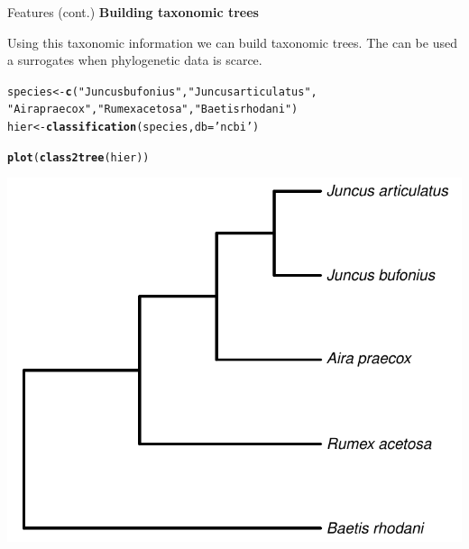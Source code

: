 \documentclass[final,t]{beamer}\usepackage[]{graphicx}\usepackage[]{color}
\makeatletter
\newcommand{\hlstr}[1]{\textcolor[rgb]{0.192,0.494,0.8}{#1}}%
\newcommand{\hlstd}[1]{\textcolor[rgb]{0.345,0.345,0.345}{#1}}%
\newcommand{\hlkwb}[1]{\textcolor[rgb]{0.69,0.353,0.396}{#1}}%
\newcommand{\hlkwc}[1]{\textcolor[rgb]{0.333,0.667,0.333}{#1}}%
\newcommand{\hlkwd}[1]{\textcolor[rgb]{0.737,0.353,0.396}{\textbf{#1}}}%
\newenvironment{kframe}{%
 \def\at@end@of@kframe{}%
 \ifinner\ifhmode%
  \def\at@end@of@kframe{\end{minipage}}%
  \begin{minipage}{\columnwidth}%
 \fi\fi%
 \def\FrameCommand##1{\hskip\@totalleftmargin \hskip-\fboxsep
 \colorbox{shadecolor}{##1}\hskip-\fboxsep
     \hskip-\linewidth \hskip-\@totalleftmargin \hskip\columnwidth}%
 \MakeFramed {\advance\hsize-\width
   \@totalleftmargin\z@ \linewidth\hsize
   \@setminipage}}%
 {\par\unskip\endMakeFramed%
 \at@end@of@kframe}
\newenvironment{knitrout}{}{} %
\renewenvironment{knitrout}{}{\vspace{-1.8em}}
\makeatother
\begin{document}
\begin{frame}[fragile]
\begin{columns}[t]
\begin{column}{.49\linewidth}
      \begin{block}{Features (cont.)}
\textcolor{i6bluedark}{\textbf{\large Building taxonomic trees}} 
        \vspace{0.5em}
        \par
        \begingroup
        \leftskip=2cm
        \noindent 
          Using this taxonomic information we can build taxonomic trees. 
          The can be used a surrogates when phylogenetic data is scarce.
        \par
        \endgroup
\begin{knitrout}\footnotesize
{}\color{fgcolor}\begin{kframe}
\begin{alltt}
\hlstd{species} \hlkwb{<-} \hlkwd{c}\hlstd{(}\hlstr{"Juncus bufonius"}\hlstd{,} \hlstr{"Juncus articulatus"}\hlstd{,}
    \hlstr{"Aira praecox"}\hlstd{,} \hlstr{"Rumex acetosa"}\hlstd{,} \hlstr{"Baetis rhodani"}\hlstd{)}
\hlstd{hier} \hlkwb{<-} \hlkwd{classification}\hlstd{(species,} \hlkwc{db} \hlstd{=} \hlstr{'ncbi'}\hlstd{)}
\end{alltt}
\end{kframe}
\end{knitrout}

\begin{knitrout}\footnotesize
{}\color{fgcolor}\begin{kframe}
\begin{alltt}
\hlkwd{plot}\hlstd{(}\hlkwd{class2tree}\hlstd{(hier))}
\end{alltt}
\end{kframe}
\end{knitrout}
\vspace{2em}

\begin{knitrout}\footnotesize
{}\color{fgcolor}

{\centering \includegraphics[width=0.4\linewidth]{figure/classtree} 

}




\end{knitrout}
\end{block}
\end{column}
\end{columns}
\end{frame}
\end{document}
